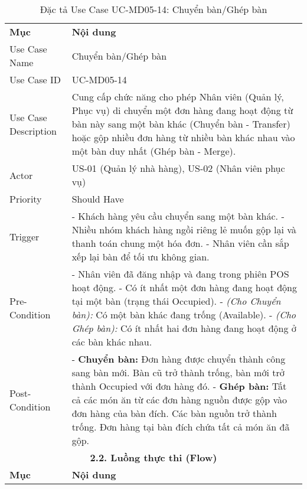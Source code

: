 \begin{longtable}{|m{4cm}|p{11cm}|}
\caption{Đặc tả Use Case UC-MD05-14: Chuyển bàn/Ghép bàn} \label{tab:uc_md05_14} \\
\hline

\endhead %
\hline
\endfoot %
\hline
\endlastfoot %
\multicolumn{2}{|c|}{\textbf{2.1. Tóm tắt (Summary)}} \\
\hline
\textbf{Mục} & \textbf{Nội dung} \\
\hline
Use Case Name & Chuyển bàn/Ghép bàn \\
\hline
Use Case ID & UC-MD05-14 \\
\hline
Use Case Description & Cung cấp chức năng cho phép Nhân viên (Quản lý, Phục vụ) di chuyển một đơn hàng đang hoạt động từ bàn này sang một bàn khác (Chuyển bàn - Transfer) hoặc gộp nhiều đơn hàng từ nhiều bàn khác nhau vào một bàn duy nhất (Ghép bàn - Merge). \\
\hline
Actor & US-01 (Quản lý nhà hàng), US-02 (Nhân viên phục vụ) \\
\hline
Priority & Should Have \\
\hline
Trigger & - Khách hàng yêu cầu chuyển sang một bàn khác. \newline - Nhiều nhóm khách hàng ngồi riêng lẻ muốn gộp lại và thanh toán chung một hóa đơn. \newline - Nhân viên cần sắp xếp lại bàn để tối ưu không gian. \\
\hline
Pre-Condition & - Nhân viên đã đăng nhập và đang trong phiên POS hoạt động. \newline - Có ít nhất một đơn hàng đang hoạt động tại một bàn (trạng thái Occupied). \newline - \textit{(Cho Chuyển bàn):} Có một bàn khác đang trống (Available). \newline - \textit{(Cho Ghép bàn):} Có ít nhất hai đơn hàng đang hoạt động ở các bàn khác nhau. \\
\hline
Post-Condition & - \textbf{Chuyển bàn:} Đơn hàng được chuyển thành công sang bàn mới. Bàn cũ trở thành trống, bàn mới trở thành Occupied với đơn hàng đó. \newline - \textbf{Ghép bàn:} Tất cả các món ăn từ các đơn hàng nguồn được gộp vào đơn hàng của bàn đích. Các bàn nguồn trở thành trống. Đơn hàng tại bàn đích chứa tất cả món ăn đã gộp. \\
\hline
\multicolumn{2}{|c|}{\textbf{2.2. Luồng thực thi (Flow)}} \\
\hline
\textbf{Mục} & \textbf{Nội dung} \\

\end{longtable}

